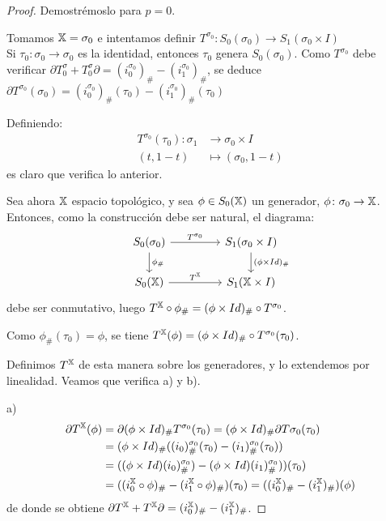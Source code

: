 \begin{proof}
  Demostrémoslo para $p = 0$.

  Tomamos ${\mathbb X} = \sigma_0$ e intentamos definir $T^{\sigma_0} \colon S_0(\sigma_0) \to S_1(\sigma_0 \times I)$ \\
  Si $\tau_0 \colon \sigma_0 \to \sigma_0$ es la identidad, entonces $\tau_0$ genera $S_0(\sigma_0)$. Como $T^{\sigma_0}$
  debe verificar $\partial T^\sigma_0 + T^\sigma_0 \partial = (i_0^{\sigma_0})_\# - (i_1^{\sigma_0})_\#$, se deduce
  $\partial T^{\sigma_0}(\sigma_0) = (i_0^{\sigma_0})_\# (\tau_0) - (i_1^{\sigma_0})_\# (\tau_0)$

  Definiendo:
  \begin{align*}
    T^{\sigma_0}(\tau_0) \colon \sigma_1 &\to \sigma_0 \times I \\
                       (t, 1-t) &\mapsto (\sigma_0, 1-t)
  \end{align*}
  es claro que verifica lo anterior.

  Sea ahora ${\mathbb X}$ espacio topológico, y sea $\phi \in S_0({\mathbb X})$ un generador, $\phi \colon \sigma_0 \to {\mathbb X}$.
  Entonces, como la construcción debe ser natural, el diagrama:
  \[
  \begin{tikzcd}
    S_0(\sigma_0) \arrow{r}{T^{\sigma_0}} \arrow{d}{\phi_\#} & [2em] S_1(\sigma_0 \times I) \arrow{d}{(\phi \times Id)_\#} \\
    \SX{0} \arrow{r}{T^\X}                 & S_1(\X \times I)
  \end{tikzcd}
  \]
  debe ser conmutativo, luego $T^{\mathbb X} \circ \phi_\# = (\phi \times Id)_\# \circ T^{\sigma_0}$.

  Como $\phi_\#(\tau_0) = \phi$, se tiene $T^{\mathbb X}(\phi) = (\phi \times Id)_\# \circ T^{\sigma_0}(\tau_0)$.

  Definimos $T^{\mathbb X}$ de esta manera sobre los generadores, y lo extendemos por linealidad. Veamos que verifica a) y b).

  a)
  \begin{align*}
    \partial T^{\mathbb X}(\phi) &= \partial(\phi \times Id)_\# T^{\sigma_0}(\tau_0) = (\phi \times Id)_\# \partial T{ \sigma_0}(\tau_0) \\
                        &= (\phi \times Id)_\# ((i_0)_\#^{\sigma_0}(\tau_0) - (i_1)_\#^{\sigma_0}(\tau_0)) \\
                        &= ((\phi \times Id) (i_0)_\#^{\sigma_0}) - (\phi \times Id) (i_1)_\#^{\sigma_0}))(\tau_0) \\
                        &= ((i_0^{\mathbb X} \circ \phi)_\# - (i_1^{\mathbb X} \circ \phi)_\#) (\tau_0) = ((i_0^{\mathbb X})_\# - (i_1^{\mathbb X})_\#)(\phi)
  \end{align*}
  de donde se obtiene $\partial T^{\mathbb X} + T^{\mathbb X} \partial = (i_0^{\mathbb X})_\# - (i_1^{\mathbb X})_\#$.


\end{proof}
